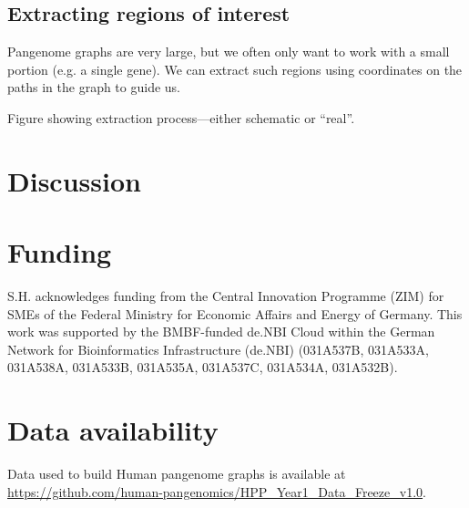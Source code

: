\documentclass{bioinfo}
\begin{document}
\subsection{Extracting regions of interest}


Pangenome graphs are very large, but we often only want to work with a small portion (e.g. a single gene).
We can extract such regions using coordinates on the paths in the graph to guide us.

Figure showing extraction process---either schematic or ``real''.

\section{Discussion}



\section*{Funding}

S.H. acknowledges funding from the Central Innovation Programme (ZIM) for SMEs of the Federal Ministry for Economic Affairs and Energy of Germany.
This work was supported by the BMBF-funded de.NBI Cloud within the German Network for Bioinformatics Infrastructure (de.NBI) (031A537B, 031A533A, 031A538A, 031A533B, 031A535A, 031A537C, 031A534A, 031A532B).

\section*{Data availability}

Data used to build Human pangenome graphs is available at \url{https://github.com/human-pangenomics/HPP_Year1_Data_Freeze_v1.0}.


%
%
%
%
%
%
%





\end{document}
